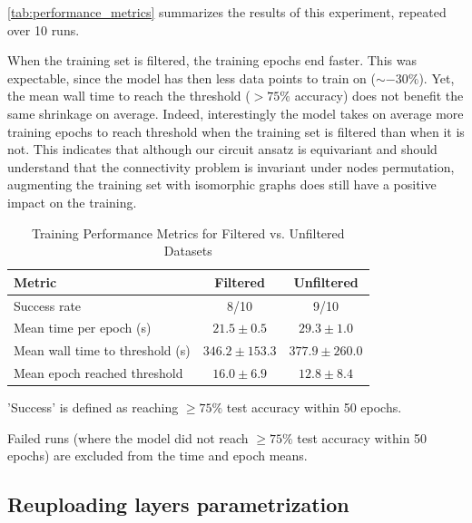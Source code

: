\documentclass{article}
\theoremstyle{definition}
\theoremstyle{plain}
\begin{document}
\autoref{tab:performance_metrics} summarizes the results of this experiment, repeated over 10 runs.

When the training set is filtered, the training epochs end faster. This was expectable, since the model has then less data points to train on ($\sim -30\%$). Yet, the mean wall time to reach the threshold ($> 75 \%$ accuracy) does not benefit the same shrinkage on average. Indeed, interestingly the model takes on average more training epochs to reach threshold when the training set is filtered than when it is not. This indicates that although our circuit ansatz is equivariant and should understand that the connectivity problem is invariant under nodes permutation, augmenting the training set with isomorphic graphs does still have a positive impact on the training. 

\begin{table}[htbp]
\centering
\begin{threeparttable}
\caption{Training Performance Metrics for Filtered vs. Unfiltered Datasets}
\label{tab:performance_metrics}
\begin{tabular}{lcc}
\toprule
\textbf{Metric} & \textbf{Filtered} & \textbf{Unfiltered} \\
\midrule
Success rate\tnote{a} & 8/10 & 9/10 \\
Mean time per epoch (s)\tnote{b} & $21.5 \pm 0.5$ & $29.3 \pm 1.0$ \\
Mean wall time to threshold (s)\tnote{b} & $346.2 \pm 153.3$ & $377.9 \pm 260.0$ \\
Mean epoch reached threshold\tnote{b} & $16.0 \pm 6.9$ & $12.8 \pm 8.4$ \\
\bottomrule
\end{tabular}
\begin{tablenotes}\footnotesize
\item[a] 'Success' is defined as reaching $\ge 75\%$ test accuracy within 50 epochs.
\item[b] Failed runs (where the model did not reach $\ge 75\%$ test accuracy within 50 epochs) are excluded from the time and epoch means.
\end{tablenotes}
\end{threeparttable}
\end{table}



\subsection{Reuploading layers parametrization}
\end{document}
